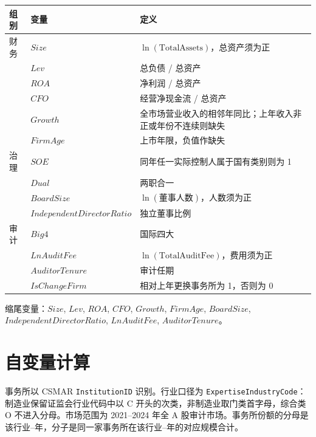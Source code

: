 \documentclass[11pt]{article}
\begin{document}
\begin{center}
\begin{threeparttable}
\caption{全部控制变量}
\begin{tabular}{llp{8.6cm}}
\toprule
组别 & 变量 & 定义 \\
\midrule
财务 & \(Size\) & \(\ln(\text{TotalAssets})\)，总资产须为正 \\
 & \(Lev\) & 总负债 / 总资产 \\
 & \(ROA\) & 净利润 / 总资产 \\
 & \(CFO\) & 经营净现金流 / 总资产 \\
 & \(Growth\) & 全市场营业收入的相邻年同比；上年收入非正或年份不连续则缺失 \\
 & \(FirmAge\) & 上市年限，负值作缺失 \\
治理 & \(SOE\) & 同年任一实际控制人属于国有类别则为 1 \\
 & \(Dual\) & 两职合一 \\
 & \(BoardSize\) & \(\ln(\text{董事人数})\)，人数须为正 \\
 & \(IndependentDirectorRatio\) & 独立董事比例 \\
审计 & \(Big4\) & 国际四大 \\
 & \(LnAuditFee\) & \(\ln(\text{TotalAuditFee})\)，费用须为正 \\
 & \(AuditorTenure\) & 审计任期 \\
 & \(IsChangeFirm\) & 相对上年更换事务所为 1，否则为 0 \\
\bottomrule
\end{tabular}
\begin{tablenotes}\footnotesize
\item 缩尾变量：\(Size\), \(Lev\), \(ROA\), \(CFO\), \(Growth\), \(FirmAge\), \(BoardSize\), \(IndependentDirectorRatio\), \(LnAuditFee\), \(AuditorTenure\)。
\end{tablenotes}
\end{threeparttable}
\end{center}

\section{自变量计算}
\label{sec:x}

事务所以 CSMAR \texttt{InstitutionID} 识别。行业口径为 \texttt{ExpertiseIndustryCode}：制造业保留证监会行业代码中以 C 开头的次类，非制造业取门类首字母，综合类 O 不进入分母。市场范围为 2021--2024 年全 A 股审计市场。事务所份额的分母是该行业--年，分子是同一家事务所在该行业--年的对应规模合计。
\end{document}
